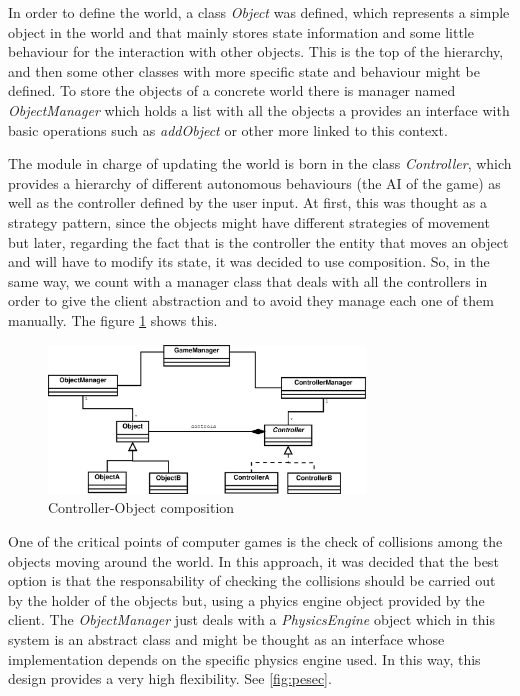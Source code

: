 \documentclass[]{article}
\begin{document}
In order to define the world, a class \emph{Object} was defined, which represents a simple object in the world and that mainly stores state information and some little behaviour for the interaction
with other objects. This is the top of the hierarchy, and then some other classes with more specific state and behaviour might be defined. To store the objects of a concrete world there is manager
named \emph{ObjectManager} which holds a list with all the objects a provides an interface with basic operations such as \emph{addObject} or other more linked to this context.

The module in charge of updating the world is born in the class \emph{Controller}, which provides a hierarchy of different autonomous behaviours (the AI of the game) as well as the controller defined
by the user input. At first, this was thought as a strategy pattern, since the objects might have different strategies of movement but later, regarding the fact that is the controller the entity
that moves an object and will have to modify its state, it was decided to use composition. So, in the same way, we count with a manager class that deals with all the controllers in order to give 
the client abstraction and to avoid they manage each one of them manually. The figure \ref{fig:object-controller} shows this.

\begin{figure}[h]
\begin{center}
\includegraphics[width=0.75\textwidth]{images/object-controller.eps}
\caption{Controller-Object composition}
\label{fig:object-controller}
\end{center}
\end{figure}

One of the critical points of computer games is the check of collisions among the objects moving around the world. In this approach, it was decided that the best option is that the responsability
of checking the collisions should be carried out by the holder of the objects but, using a phyics engine object provided by the client. The \emph{ObjectManager} just deals with a \emph{PhysicsEngine}
object which in this system is an abstract class and might be thought as an interface whose implementation depends on the specific physics engine used. In this way, this design provides a very high
flexibility. See \ref{fig:pesec}.
\end{document}
